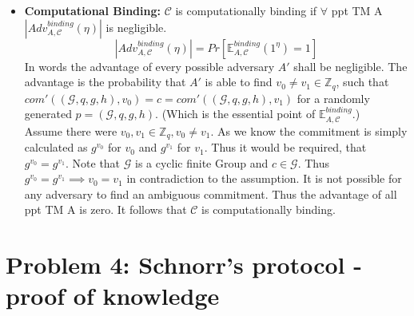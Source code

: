 \documentclass[12pt,pdftex,a4paper]{article}
\begin{document}
\begin{itemize}
\item \textbf{Computational Binding:}
$\mathcal{C}$ is computationally binding if $\forall$ ppt TM A $|Adv_{A,\mathcal{C}}^{binding}(\eta)|$ is negligible.
$$|Adv_{A,\mathcal{C}}^{binding}(\eta)| = Pr[\mathbb{E}_{A,\mathcal{C}}^{binding}(1^{\eta})=1]$$
In words the advantage of every possible adversary $A'$ shall be negligible. The advantage is the probability that $A'$ is able to find $v_0 \neq v_1 \in \mathbb{Z}_q$, such that $com'((\mathcal{G},q,g,h),v_0) = c = com'((\mathcal{G},q,g,h),v_1)$ for a randomly generated $p = (\mathcal{G},q,g,h)$. (Which is the essential point of $\mathbb{E}_{A,\mathcal{C}}^{binding}$.)\\
Assume there were $v_0, v_1 \in \mathbb{Z}_q, v_0 \neq v_1$. As we know the commitment is simply calculated as $g^{v_0}$ for $v_0$ and $g^{v_1}$ for $v_1$. Thus it would be required, that $g^{v_0} = g^{v_1}$. Note that $\mathcal{G}$ is a cyclic finite Group and $c \in \mathcal{G}$. Thus $g^{v_0} = g^{v_1} \implies v_0 = v_1$ in contradiction to the assumption. It is not possible for any adversary to find an ambiguous commitment. Thus the advantage of all ppt TM A is zero. It follows that $\mathcal{C}$ is computationally binding.
\end{itemize}

\section*{Problem 4: Schnorr’s protocol - proof of knowledge}
\end{document}
